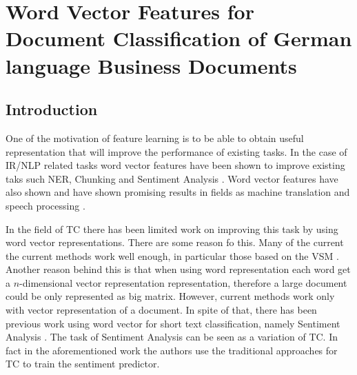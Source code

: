 \chapter{Word Vector Features  for Document Classification of German language Business Documents}
\label{chap:rel_word2vec_doc_classification}


\section{Introduction}
\label{sec:w2v4tc_intro}

One of the motivation of feature learning is to be able to
obtain useful representation that will improve the performance of  existing tasks. In the case of
\ac{IR}/\ac{NLP} related tasks  word vector features have been shown to
improve existing taks such \ac{NER}, Chunking and Sentiment Analysis
\cite{Turian:2010:WRS:1858681.1858721} \cite{DBLP:journals/corr/abs-1103-0398}. Word vector features have also shown 
  and have shown promising results in
fields as machine translation and speech processing \cite{collobert:2008}
\cite{DBLP:journals/corr/MikolovLS13}.  

In the field of \ac{TC}  there has been  limited work on improving  this
task by using word vector representations. There are some reason 
fo this. Many of the current the current methods work well enough, in particular those
based on the \ac{VSM} \cite{Sebastiani02}. Another reason behind this is that
when using word representation each word get a $n$-dimensional vector
representation representation, therefore a large document could be only
represented as big matrix. However,  current methods work only with vector
representation of a document. In spite of that, there has been previous work using word
vector for short text classification, namely Sentiment Analysis
\cite{maas2011learning}. The task of Sentiment Analysis can be seen as a variation of
\ac{TC}. In fact in the aforementioned work the authors use the traditional
approaches for \ac{TC} to train the sentiment predictor. 

